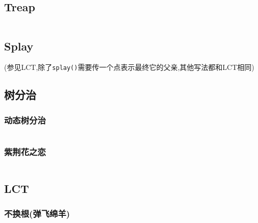 \documentclass[a4paper]{article}
\begin{document}
\begin{multicols}{2}


			\subsection{Treap}
				\inputminted{cpp}{../src/datastructure/Treap.cpp}
			




			\subsection{Splay}
				(参见LCT,除了\texttt{splay()}需要传一个点表示最终它的父亲,其他写法都和LCT相同)
			
			\subsection{树分治}

				
				\subsubsection{动态树分治}
					\inputminted{cpp}{../src/datastructure/动态树分治.cpp}

				\subsubsection{紫荆花之恋}
					\inputminted{cpp}{../src/datastructure/紫荆花之恋.cpp}

				\subsection{LCT}
					\subsubsection{不换根(弹飞绵羊)}
						\inputminted{cpp}{../src/datastructure/LCT(不换根).cpp}
				

\end{multicols}
\end{document}
